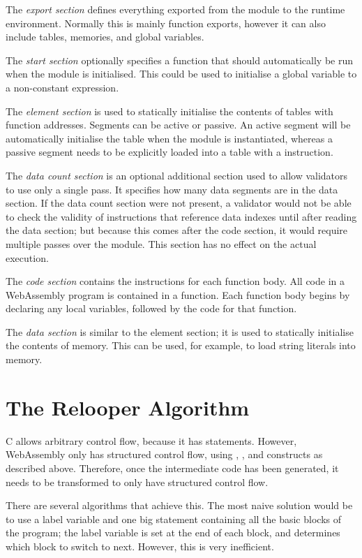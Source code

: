\documentclass[00-main.tex]{subfiles}
\begin{document}
The \emph{export section} defines everything exported from the module to the runtime environment.
Normally this is mainly function exports, however it can also include tables, memories, and global variables.

The \emph{start section} optionally specifies a function that should automatically be run when the module is initialised.
This could be used to initialise a global variable to a non-constant expression.

The \emph{element section} is used to statically initialise the contents of tables with function addresses.
Segments can be active or passive.
An active segment will be automatically initialise the table when the module is instantiated, whereas a passive segment needs to be explicitly loaded into a table with a  instruction.

The \emph{data count section} is an optional additional section used to allow validators to use only a single pass.
It specifies how many data segments are in the data section.
If the data count section were not present, a validator would not be able to check the validity of instructions that reference data indexes until after reading the data section; but because this comes after the code section, it would require multiple passes over the module.
This section has no effect on the actual execution.

The \emph{code section} contains the instructions for each function body.
All code in a WebAssembly program is contained in a function.
Each function body begins by declaring any local variables, followed by the code for that function.

The \emph{data section} is similar to the element section; it is used to statically initialise the contents of memory.
This can be used, for example, to load string literals into memory.


\section{The Relooper Algorithm}\label{sec:prep:relooper}

C allows arbitrary control flow, because it has  statements.
However, WebAssembly only has structured control flow, using , , and  constructs as described above.
Therefore, once the intermediate code has been generated, it needs to be transformed to only have structured control flow.

There are several algorithms that achieve this.
The most naive solution would be to use a label variable and one big  statement containing all the basic blocks of the program; the label variable is set at the end of each block, and determines which block to switch to next. However, this is very inefficient.
\end{document}

